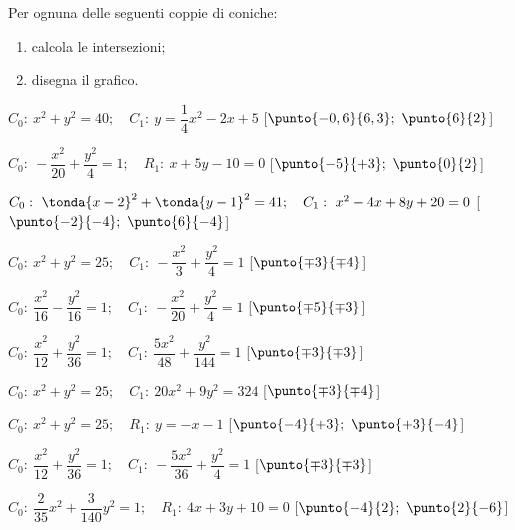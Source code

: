 \begin{esercizio}\label{ese:03.1}
Per ognuna delle seguenti coppie di coniche:
\begin{enumerate} [nosep]
 \item calcola le intersezioni;
 \item disegna il grafico.
\end{enumerate}

 \begin{enumeratea}
  \item  \(C_0:~x^2+y^2=40; \quad C_1:~y=\dfrac{1}{4}x^2 -2x+5\)
  \hfill [\(\punto{-0,6}{6,3};~\punto{6}{2}\)]
  \item  \(C_0:~-\dfrac{x^2}{20} + \dfrac{y^2}{4}=1; \quad 
           R_1:~x+5y-10=0\)
  \hfill [\(\punto{-5}{+3};~\punto{0}{2}\)]
  \item  \(C_0:~\tonda{x-2}^2+\tonda{y-1}^2=41; \quad C_1:~x^2-4x+8y+20=0\)
  \hfill [\(\punto{-2}{-4};~\punto{6}{-4}\)]
  \item  \(C_0:~x^2+y^2=25; \quad C_1:~-\dfrac{x^2}{3} + \dfrac{y^2}{4}=1\)
  \hfill [\(\punto{\mp 3}{\mp 4}\)]
  \item  \(C_0:~\dfrac{x^2}{16} - \dfrac{y^2}{16}=1; \quad 
           C_1:~-\dfrac{x^2}{20} + \dfrac{y^2}{4}=1\)
  \hfill [\(\punto{\mp 5}{\mp 3}\)]
  \item  \(C_0:~\dfrac{x^2}{12} + \dfrac{y^2}{36}=1; \quad 
           C_1:~\dfrac{5x^2}{48} + \dfrac{y^2}{144}=1\)
  \hfill [\(\punto{\mp 3}{\mp 3}\)]
  \item  \(C_0:~x^2+y^2=25; \quad C_1:~20x^2+9y^2=324\)
  \hfill [\(\punto{\mp 3}{\mp 4}\)]
  \item  \(C_0:~x^2+y^2=25; \quad R_1:~y=-x-1\)
  \hfill [\(\punto{-4}{+3};~\punto{+3}{-4}\)]
  \item  \(C_0:~\dfrac{x^2}{12} + \dfrac{y^2}{36}=1; \quad 
           C_1:~-\dfrac{5x^2}{36} + \dfrac{y^2}{4}=1\)
  \hfill [\(\punto{\mp 3}{\mp 3}\)]
  \item  \(C_0:~\dfrac{2}{35}x^2 + \dfrac{3}{140}y^2=1; \quad 
           R_1:~4x+3y+10=0\)
  \hfill [\(\punto{-4}{2};~\punto{2}{-6}\)]
 \end{enumeratea}
\end{esercizio}
